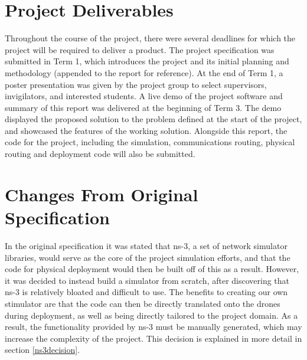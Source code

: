 \section{Project Deliverables}
Throughout the course of the project, there were several deadlines for which the project will be required to deliver a product. The project specification was submitted in Term 1, which introduces the project and its initial planning and methodology (appended to the report for reference). At the end of Term 1, a poster presentation was given by the project group to select supervisors, invigilators, and interested students. A live demo of the project software and summary of this report was delivered at the beginning of Term 3. The demo displayed the proposed solution to the problem defined at the start of the project, and showcased the features of the working solution. Alongside this report, the code for the project, including the simulation, communications routing, physical routing and deployment code will also be submitted.

\section{Changes From Original Specification}
In the original specification it was stated that ns-3, a set of network simulator libraries, would serve as the core of the project simulation efforts, and that the code for physical deployment would then be built off of this as a result. However, it was decided to instead build a simulator from scratch, after discovering that ns-3 is relatively bloated and difficult to use. The benefits to creating our own stimulator are that the code can then be directly translated onto the drones during deployment, as well as being directly tailored to the project domain. As a result, the functionality provided by ns-3 must be manually generated, which may increase the complexity of the project. This decision is explained in more detail in section \ref{ns3decision}.

